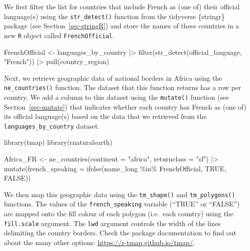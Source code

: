 \documentclass[
  letterpaper,
  DIV=11,
  numbers=noendperiod]{scrreprt}
\newenvironment{Shaded}{\begin{snugshade}}{\end{snugshade}}
\newcommand{\AttributeTok}[1]{\textcolor[rgb]{0.40,0.45,0.13}{#1}}
\newcommand{\ConstantTok}[1]{\textcolor[rgb]{0.56,0.35,0.01}{#1}}
\newcommand{\FunctionTok}[1]{\textcolor[rgb]{0.28,0.35,0.67}{#1}}
\newcommand{\NormalTok}[1]{\textcolor[rgb]{0.00,0.23,0.31}{#1}}
\newcommand{\OtherTok}[1]{\textcolor[rgb]{0.00,0.23,0.31}{#1}}
\newcommand{\SpecialCharTok}[1]{\textcolor[rgb]{0.37,0.37,0.37}{#1}}
\newcommand{\StringTok}[1]{\textcolor[rgb]{0.13,0.47,0.30}{#1}}
\begin{document}
We first filter the list for countries that include French as (one of)
their official language(s) using the \texttt{str\_detect()} function
from the tidyverse \{stringr\} package (see Section~\ref{sec-stringR})
and store the names of these countries in a new \texttt{R} object called
\texttt{FrenchOfficial}.

\begin{Shaded}
\begin{Highlighting}[]
\NormalTok{FrenchOfficial }\OtherTok{\textless{}{-}}\NormalTok{ languages\_by\_country }\SpecialCharTok{|\textgreater{}} 
  \FunctionTok{filter}\NormalTok{(}\FunctionTok{str\_detect}\NormalTok{(official\_language, }\StringTok{"French"}\NormalTok{)) }\SpecialCharTok{|\textgreater{}} 
  \FunctionTok{pull}\NormalTok{(country\_region)}
\end{Highlighting}
\end{Shaded}

Next, we retrieve geographic data of national borders in Africa using
the \texttt{ne\_countries()} function. The dataset that this function
returns has a row per country. We add a column to this dataset using the
\texttt{mutate()} function (see Section~\ref{sec-mutate}) that indicates
whether each country has French as (one of) its official language(s)
based on the data that we retrieved from the
\texttt{languages\_by\_country} dataset.

\begin{Shaded}
\begin{Highlighting}[]
\FunctionTok{library}\NormalTok{(tmap)}
\FunctionTok{library}\NormalTok{(rnaturalearth)}

\NormalTok{Africa\_FR }\OtherTok{\textless{}{-}} \FunctionTok{ne\_countries}\NormalTok{(}\AttributeTok{continent =} \StringTok{"africa"}\NormalTok{, }
                          \AttributeTok{returnclass =} \StringTok{"sf"}\NormalTok{) }\SpecialCharTok{|\textgreater{}} 
  \FunctionTok{mutate}\NormalTok{(}\AttributeTok{french\_speaking =} 
           \FunctionTok{ifelse}\NormalTok{(name\_long }\SpecialCharTok{\%in\%}\NormalTok{ FrenchOfficial, }
                  \ConstantTok{TRUE}\NormalTok{, }\ConstantTok{FALSE}\NormalTok{))}
\end{Highlighting}
\end{Shaded}

We then map this geographic data using the \texttt{tm\_shape()} and
\texttt{tm\_polygons()} functions. The values of the
\texttt{french\_speaking} variable (``TRUE'' or ``FALSE'') are mapped
onto the fill colour of each polygon (i.e.~each country) using the
\texttt{fill.scale} argument. The \texttt{lwd} argument controls the
width of the lines delimiting the country borders. Check the package
documentation to find out about the many other options:
\url{https://r-tmap.github.io/tmap/}.
\end{document}
